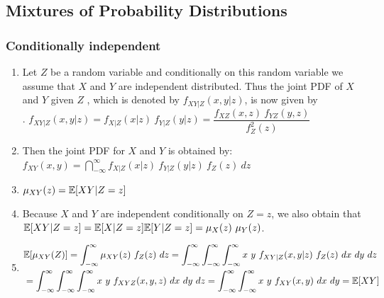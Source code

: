 \subsection{Mixtures of Probability Distributions}

\subsubsection{Conditionally independent}

\begin{enumerate}
    \item Let $Z$ be a random variable and conditionally on this random variable we assume that $X$ and $Y$ are independent distributed.
    Thus the joint PDF of $X$ and $Y$ given $Z$ , which is denoted by $f _{X Y |Z} (x, y|z)$, is now given by
    \hfill \cite{statistics/book/Statistics-for-Data-Scientists/Maurits-Kaptein}
    \\
    .\hfill
    $
        f_{X Y |Z} (x, y|z)
        = f _{X|Z} (x|z)\ f_{Y |Z} (y|z)
        = \dfrac{f_{X Z} (x, z)\ f_{Y Z} (y, z) } {f^2_Z (z)}
    $
    \hfill \cite{statistics/book/Statistics-for-Data-Scientists/Maurits-Kaptein}

    \item Then the joint PDF for $X$ and $Y$ is obtained by:
    $
        f _{X Y} (x, y)
        = \dint ^{\infty }_{-\infty} f_{X|Z} (x|z)\ f_{Y |Z} (y|z)\ f_Z (z)\ dz
    $
    \hfill \cite{statistics/book/Statistics-for-Data-Scientists/Maurits-Kaptein}

    \item $\mu_{X Y} (z) = \mathbb{E}[X Y |Z = z]$
    \hfill \cite{statistics/book/Statistics-for-Data-Scientists/Maurits-Kaptein}

    \item Because $X$ and $Y$ are independent conditionally on $Z = z$, we also obtain that $\mathbb{E}[X Y |Z = z] = \mathbb{E}[X|Z = z] \mathbb{E}[Y |Z = z] = \mu_X (z)\ \mu_Y (z)$. 
    \hfill \cite{statistics/book/Statistics-for-Data-Scientists/Maurits-Kaptein}

    \item 
    $
        \begin{aligned}
            &\mathbb{E}[\mu_{X Y }(Z )] 
            = \displaystyle\int^\infty_{-\infty} \mu_{X Y} (z)\ f_Z (z)\ dz
            = \displaystyle\int^\infty_{-\infty} \displaystyle\int^\infty_{-\infty} \displaystyle\int^\infty_{-\infty} x\ y\ f_{X Y |Z} (x, y|z)\ f_Z (z)\ dx\ dy\ dz \\
            &= \displaystyle\int^\infty_{-\infty} \displaystyle\int^\infty_{-\infty} \displaystyle\int^\infty_{-\infty} x\ y\ f_{X Y Z} (x, y, z)\ dx\ dy\ dz 
            = \displaystyle\int^\infty_{-\infty} \displaystyle\int^\infty_{-\infty} x\ y\ f_{X Y} (x, y)\ dx\ dy 
            = \mathbb{E}[X Y]
        \end{aligned}
    $
    \hfill \cite{statistics/book/Statistics-for-Data-Scientists/Maurits-Kaptein}


\end{enumerate}
